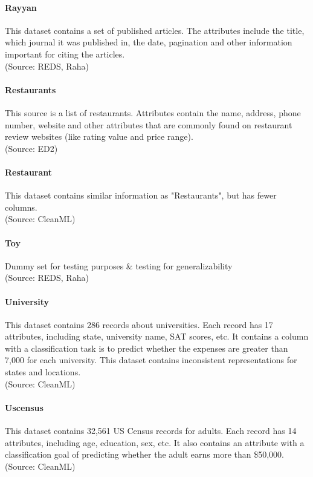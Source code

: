 \paragraph{Rayyan}
This dataset contains a set of published articles. The attributes include the title, which journal it was published in, the date, pagination and other information important for citing the articles.
\\(Source: REDS, Raha)

\paragraph{Restaurants}
This source is a list of restaurants. Attributes contain the name, address, phone number, website and other attributes that are commonly found on restaurant review websites (like rating value and price range).
\\(Source: ED2)

\paragraph{Restaurant}
This dataset contains similar information as "Restaurants", but has fewer columns.
\\(Source: CleanML)

\paragraph{Toy}
Dummy set for testing purposes \& testing for generalizability
\\(Source: REDS, Raha)

\paragraph{University}
This dataset contains 286 records about universities. Each record has 17 attributes, including state, university name, SAT scores, etc. It contains a column with a classification task is to predict whether the expenses are greater than 7,000 for each university. This dataset contains inconsistent representations for states and locations.
\\(Source: CleanML)

\paragraph{Uscensus}
This dataset contains 32,561 US Census records for adults. Each record has 14 attributes, including age, education, sex, etc. It also contains an attribute with a classification goal of predicting whether the adult earns more than \$50,000. 
\\(Source: CleanML)


